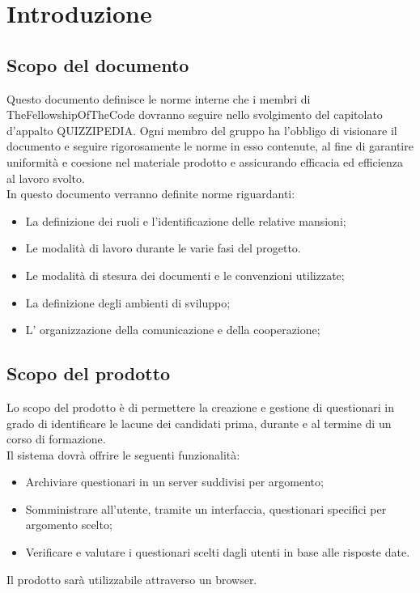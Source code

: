\section{Introduzione}

\subsection{Scopo del documento}
Questo documento definisce le norme interne che i membri di TheFellowshipOfTheCode dovranno seguire nello svolgimento del capitolato d'appalto QUIZZIPEDIA. Ogni membro del gruppo ha l'obbligo di visionare il documento e seguire rigorosamente le norme in esso contenute, al fine di garantire uniformità e coesione nel materiale prodotto e assicurando efficacia ed efficienza al lavoro svolto.
\\In questo documento verranno definite norme riguardanti:
\begin{itemize}
\item
La definizione dei ruoli e l'identificazione delle relative mansioni;	
\item
Le modalità di lavoro durante le varie fasi del progetto.
\item
Le modalità di stesura dei documenti e le convenzioni utilizzate;
\item
La definizione degli ambienti di sviluppo;
\item
L' organizzazione della comunicazione e della cooperazione;
\end{itemize}

\subsection{Scopo del prodotto}
Lo scopo del prodotto è di permettere la creazione e gestione di questionari in grado di identificare le lacune dei candidati prima, durante e al termine di un corso di formazione. 
\\Il sistema dovrà offrire le seguenti funzionalità:
\begin{itemize}
\item
Archiviare questionari in un server suddivisi per argomento;
\item
Somministrare all'utente, tramite un interfaccia, questionari specifici per argomento scelto;
\item
Verificare e valutare i questionari scelti dagli utenti in base alle risposte date.
\end{itemize}

Il prodotto sarà utilizzabile attraverso un browser.

